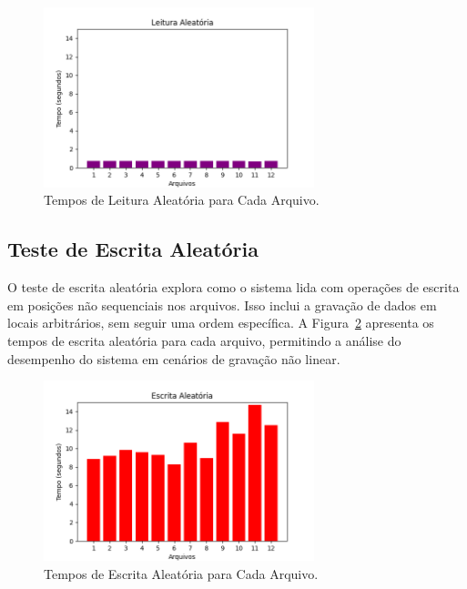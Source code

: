 \documentclass[
	12pt,				%
	openright,			%
	oneside,			%
	a4paper,			%
	chapter=TITLE,		%
	english,			%
	french,				%
	spanish,			%
	brazil				%
	]{abntex2}
\theoremstyle{definition}
\begin{document}
\begin{figure}[H]
    \centering
    \includegraphics[width=0.7\textwidth]{RandomRead.png}
    \caption{Tempos de Leitura Aleatória para Cada Arquivo.}
    \label{fig:rr}
\end{figure}


\subsection{Teste de Escrita Aleatória}

O teste de escrita aleatória explora como o sistema lida com operações de 
escrita em posições não sequenciais nos arquivos. Isso inclui a gravação 
de dados em locais arbitrários, sem seguir uma ordem específica. 
A Figura~\ref{fig:rw} apresenta os tempos de escrita aleatória para cada arquivo, 
permitindo a análise do desempenho do sistema em cenários de gravação não linear.

\begin{figure}[H]
    \centering
	\includegraphics[width=0.7\textwidth]{RandomWrite.png}
    \caption{Tempos de Escrita Aleatória para Cada Arquivo.}
    \label{fig:rw}
\end{figure}
\end{document}
